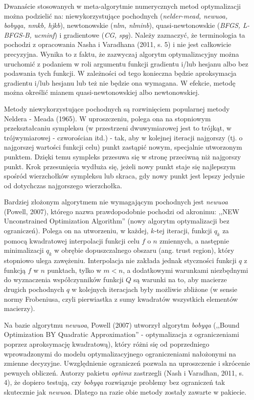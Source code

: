 Dwanaście stosowanych w meta-algorytmie numerycznych metod optymalizacji można podzielić na: niewykorzystujące pochodnych (\textit{nelder-mead, newuoa, bobyqa, nmkb, hjkb}), newtonowskie (\textit{nlm, nlminb}), quasi-newtonowskie (\textit{BFGS, L-BFGS-B, ucminf}) i gradientowe (\textit{CG, spg}). Należy zaznaczyć, że terminologia ta pochodzi z opracowania Nasha i Varadhana (2011, s. 5) i nie jest całkowicie precyzyjna. Wynika to z faktu, że zazwyczaj algorytm optymalizacyjny można uruchomić z podaniem w roli argumentu funkcji gradientu i/lub hesjanu albo bez podawania tych funkcji. W zależności od tego konieczna będzie aproksymacja gradientu i/lub hesjanu lub też nie będzie ona wymagana. W efekcie, metodę można określić mianem quasi-newtonowskiej albo newtonowskiej.     

Metody niewykorzystujące pochodnych są rozwinięciem popularnej metody Neldera - Meada (1965). \nocite{Nelder_Mead_1965} W uproszczeniu, polega ona na stopniowym przekształcaniu sympleksu (w przestrzeni dwuwymiarowej jest to trójkąt, w trójwymiarowej - czworościan itd.) - tak, aby w kolejnej iteracji najgorszy (tj. o najgorszej wartości funkcji celu) punkt zastąpić nowym, specjalnie utworzonym punktem. Dzięki temu sympleks przesuwa się w stronę przeciwną niż najgorszy punkt. Krok przesunięcia wydłuża się, jeżeli nowy punkt staje się najlepszym spośród wierzchołków sympleksu lub skraca, gdy nowy punkt jest lepszy jedynie od dotychczas najgorszego wierzchołka. 
 
Bardziej złożonym algorytmem nie wymagającym pochodnych jest \textit{newuoa} (Powell, 2007)\nocite{Powell_2007}, którego nazwa prawdopodobnie pochodzi od akronimu: ,,NEW Unconstrained Optimization Algorithm'' (nowy algorytm optymalizacji bez ograniczeń). Polega on na utworzeniu, w każdej, $k$-tej iteracji, funkcji $q_{k}$ za pomocą kwadratowej interpolacji funkcji celu $f$ o $n$ zmiennych, a następnie minimalizacji $q_{k }$ w obrębie dopuszczalnego obszaru (ang. trust region), który stopniowo ulega zawężeniu. Interpolacja nie zakłada jednak styczności funkcji $q$ z funkcją $f$ w $n$ punktach, tylko w $m<n$, a dodatkowymi warunkami niezbędnymi do wyznaczenia współczynników funkcji $Q$ są warunki na to, aby macierze drugich pochodnych $q$ w kolejnych iteracjach były możliwie zbliżone (w sensie normy Frobeniusa, czyli pierwiastka z sumy kwadratów wszystkich elementów macierzy).     

Na bazie algorytmu \textit{newuoa}, Powell (2007) utworzył algorytm \textit{bobyqa} (,,Bound Optimization BY Quadratic Approximation'' - optymalizacja z ograniczeniami poprzez aproksymację kwadratową), który różni się od poprzedniego wprowadzonymi do modelu optymalizacyjnego ograniczeniami nałożonymi na zmienne decyzyjne. Uwzględnienie ograniczeń pozwala na uproszczenie i skrócenie pewnych obliczeń. Autorzy pakietu \textit{optimx} zastrzegli (Nash i Varadhan, 2011, s. 4), że dopiero testują, czy \textit{bobyqa} rozwiązuje problemy bez ograniczeń tak skutecznie jak \textit{newuoa}. Dlatego na razie obie metody zostały zawarte w pakiecie.

